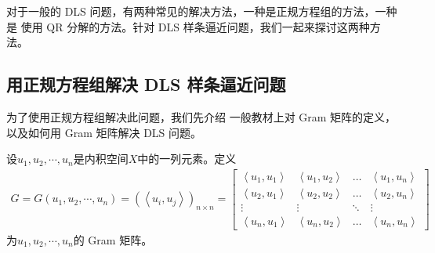   对于一般的 DLS 问题，有两种常见的解决方法，一种是正规方程组的方法，一种是
  使用 QR 分解的方法。针对 DLS 样条逼近问题，我们一起来探讨这两种方法。


\subsection{用正规方程组解决 DLS 样条逼近问题}
\label{subsec:FINALDLSSplinesApproximationviaNormalEquations}

为了使用正规方程组解决此问题，我们先介绍
一般教材上对 Gram 矩阵的定义，
以及如何用 Gram 矩阵解决 DLS 问题。


\begin{defn}[Gram 矩阵]
  \label{def:FINALGramMatrix}
  设$u_{1},u_{2},\cdots,u_{n}$是内积空间$X$中的一列元素。定义
  \begin{equation}
    \label{eq:FINALGramMatrix}
    \begin{aligned}
      G  =G\left(u_1, u_2, \cdots, u_n\right)=
          \left(\left\langle u_i, u_j\right\rangle\right)_{n\times n} 
         =\left[\begin{array}{cccc}
          \left\langle u_1, u_1\right\rangle &
          \left\langle u_1, u_2\right\rangle &
                                      \ldots &
          \left\langle u_1, u_n\right\rangle \\
          \left\langle u_2, u_1\right\rangle &
          \left\langle u_2, u_2\right\rangle &
                                      \ldots &
          \left\langle u_2, u_n\right\rangle \\
          \vdots & \vdots & \ddots & \vdots \\
          \left\langle u_n, u_1\right\rangle &
          \left\langle u_n, u_2\right\rangle &
                                      \ldots &
           \left\langle u_n, u_n\right\rangle
      \end{array}\right]
    \end{aligned}
  \end{equation}
  为$u_{1},u_{2},\cdots,u_{n}$的 \textnormal{Gram} 矩阵。
\end{defn}


